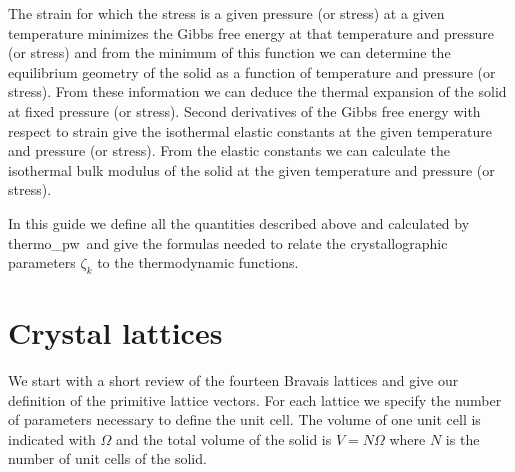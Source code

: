 \documentclass[12pt,a4paper]{article}
\def\tpw{{\sc thermo\_pw}}
\begin{document}
The strain for which the stress is a given pressure (or stress) at a given
temperature minimizes the Gibbs free energy at that temperature and
pressure (or stress) and from the minimum of this function we can determine 
the equilibrium geometry of the solid as a function of temperature and 
pressure (or stress). 
From these information we can deduce the thermal expansion of the 
solid at fixed pressure (or stress). Second derivatives of the Gibbs free
energy with respect to strain give the isothermal elastic constants at the 
given temperature and pressure (or stress). From the elastic constants 
we can calculate the isothermal bulk modulus of the solid at the
given temperature and pressure (or stress).

In this guide we define all the quantities described above and calculated 
by \tpw\ and give the formulas needed to relate the crystallographic
parameters $\zeta_k$ to the thermodynamic functions.

\newpage

\section{\color{coral}Crystal lattices}
We start with a short review of the fourteen Bravais lattices and give
our definition of the primitive lattice vectors. For each lattice we 
specify the number of parameters necessary to define the unit cell.
The volume of one unit cell is indicated with $\Omega$ and the total 
volume of the solid is $V=N\Omega$ where $N$ is the number of unit cells
of the solid. 
\end{document}
